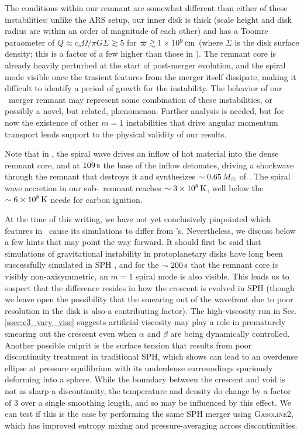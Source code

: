 
The conditions within our remnant are somewhat different than either of these instabilities: unlike the ARS setup, our inner disk is thick (scale height and disk radius are within an order of magnitude of each other) and has a Toomre paraometer of $Q \approx c_s\Omega/\pi G \Sigma \gtrsim 5$ for $\varpi \gtrsim 1\times10^9\,\mathrm{cm}$ (where $\Sigma$ is the disk surface density; this is a factor of a few higher than those in \citealt{kash+15}).  The remnant core is already heavily perturbed at the start of post-merger evolution, and the spiral mode visible once the trasient features from the merger itself dissipate, making it difficult to identify a period of growth for the instability.  The behavior of our \arepo\ merger remnant may represent some combination of these instabilities, or possibly a novel, but related, phenomenon.  Further analysis is needed, but for now the existence of other $m = 1$ instabilities that drive angular momentum transport lends support to the physical validity of our results.

Note that in \citep{kash+15}, the spiral wave drives an inflow of hot material into the dense remnant core, and at $109\,\mathrm{s}$ the base of the inflow detonates, driving a shockwave through the remnant that destroys it and synthesizes $\sim0.65\,\Msun$ of \Ni.  The spiral wave accretion in our sub-\Mch\ remnant reaches $\sim3\times10^8\,\mathrm{K}$, well below the $\sim6\times10^8\,\mathrm{K}$ neede for carbon ignition.

At the time of this writing, we have not yet conclusively pinpointed which features in \gasoline\ cause its simulations to differ from \arepo's.  Nevertheless, we discuss below a few hints that may point the way forward.  It should first be said that simulations of gravitational instability in protoplanetary disks have long been successfully simulated in SPH \citep{ricela05, merub10, rogew12}, and for the $\sim200\,\mathrm{s}$ that the remnant core is visibly non-axisymmetric, an $m = 1$ spiral mode is also visible.  This leads us to suspect that the difference resides in how the crescent is evolved in SPH (though we leave open the possibility that the smearing out of the wavefront due to poor resolution in the disk is also a contributing factor).  The high-viscosity run in Sec. \ref{ssec:c3_vary_visc} suggests artificial viscosity may play a role in prematurely smearing out the crescent even when $\alpha$ and $\beta$ are being dynamically controlled.  Another possible culprit is the surface tension that results from poor discontinuity treatment in traditional SPH, which \cite{hesss10} shows can lead to an overdense ellipse at pressure equilibrium with its underdense surroundings spuriously deforming into a sphere.  While the boundary between the crescent and void is not as sharp a discontinuity, the temperature and density do change by a factor of $3$ over a single smoothing length, and so may be influenced by this effect.  We can test if this is the case by performing the same SPH merger using \textsc{Gasoline2}, which has improved entropy mixing and pressure-averaging across discontinuities.

